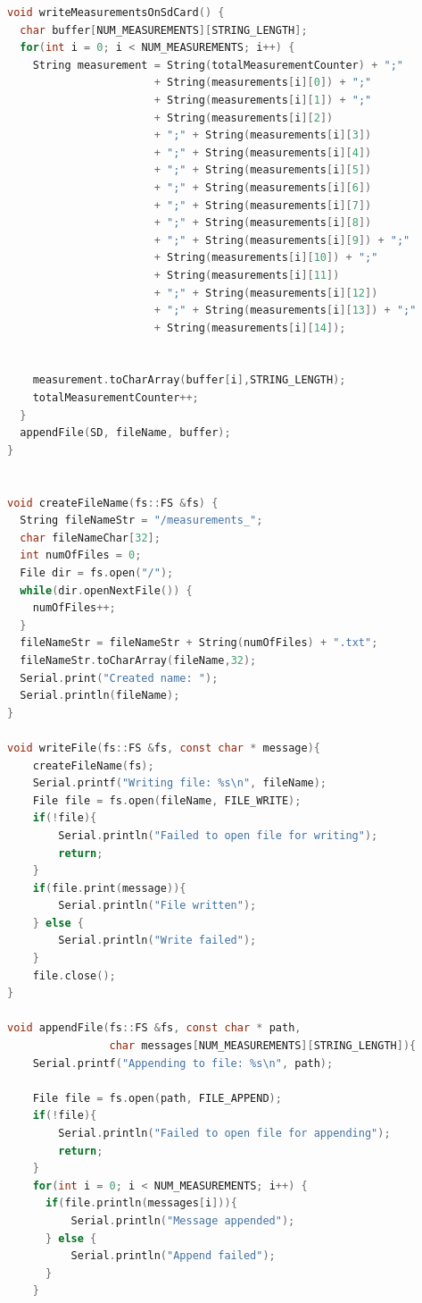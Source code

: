 \documentclass[runningheads]{llncs}
\begin{document}
\begin{lstlisting}[language=C]
void writeMeasurementsOnSdCard() {
  char buffer[NUM_MEASUREMENTS][STRING_LENGTH];
  for(int i = 0; i < NUM_MEASUREMENTS; i++) {
    String measurement = String(totalMeasurementCounter) + ";"
                       + String(measurements[i][0]) + ";" 
                       + String(measurements[i][1]) + ";" 
                       + String(measurements[i][2])
                       + ";" + String(measurements[i][3]) 
                       + ";" + String(measurements[i][4]) 
                       + ";" + String(measurements[i][5])
                       + ";" + String(measurements[i][6]) 
                       + ";" + String(measurements[i][7]) 
                       + ";" + String(measurements[i][8])
                       + ";" + String(measurements[i][9]) + ";" 
                       + String(measurements[i][10]) + ";" 
                       + String(measurements[i][11])
                       + ";" + String(measurements[i][12]) 
                       + ";" + String(measurements[i][13]) + ";" 
                       + String(measurements[i][14]); 
                 
    
    measurement.toCharArray(buffer[i],STRING_LENGTH);
    totalMeasurementCounter++;
  }
  appendFile(SD, fileName, buffer);
}


void createFileName(fs::FS &fs) {
  String fileNameStr = "/measurements_";
  char fileNameChar[32];
  int numOfFiles = 0;
  File dir = fs.open("/");
  while(dir.openNextFile()) {
    numOfFiles++;
  }
  fileNameStr = fileNameStr + String(numOfFiles) + ".txt";
  fileNameStr.toCharArray(fileName,32);
  Serial.print("Created name: ");
  Serial.println(fileName);
}

void writeFile(fs::FS &fs, const char * message){
    createFileName(fs);
    Serial.printf("Writing file: %s\n", fileName);
    File file = fs.open(fileName, FILE_WRITE);
    if(!file){
        Serial.println("Failed to open file for writing");
        return;
    }
    if(file.print(message)){
        Serial.println("File written");
    } else {
        Serial.println("Write failed");
    }
    file.close();
}

void appendFile(fs::FS &fs, const char * path, 
                char messages[NUM_MEASUREMENTS][STRING_LENGTH]){
    Serial.printf("Appending to file: %s\n", path);

    File file = fs.open(path, FILE_APPEND);
    if(!file){
        Serial.println("Failed to open file for appending");
        return;
    }
    for(int i = 0; i < NUM_MEASUREMENTS; i++) {
      if(file.println(messages[i])){
          Serial.println("Message appended");
      } else {
          Serial.println("Append failed");
      }
    }


\end{lstlisting}
\end{document}

